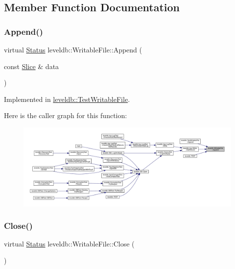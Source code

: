 \subsection{Member Function Documentation}
\mbox{\label{classleveldb_1_1_writable_file_a53b41841d9577d28f65d4d90e1660de8}} 
\subsubsection{\texorpdfstring{Append()}{Append()}}
{\footnotesize\ttfamily virtual \mbox{\hyperlink{classleveldb_1_1_status}{Status}} leveldb\+::\+Writable\+File\+::\+Append (\begin{DoxyParamCaption}\item[{const \mbox{\hyperlink{classleveldb_1_1_slice}{Slice}} \&}]{data }\end{DoxyParamCaption})\hspace{0.3cm}{\ttfamily [pure virtual]}}



Implemented in \mbox{\hyperlink{classleveldb_1_1_test_writable_file_a282d3c3c27ef70c65f467f50abfd93bb}{leveldb\+::\+Test\+Writable\+File}}.

Here is the caller graph for this function\+:
\nopagebreak
\begin{figure}[H]
\begin{center}
\leavevmode
\includegraphics[width=350pt]{classleveldb_1_1_writable_file_a53b41841d9577d28f65d4d90e1660de8_icgraph}
\end{center}
\end{figure}
\mbox{\label{classleveldb_1_1_writable_file_a2efbf9c02a26028b5002df73b4393915}} 
\subsubsection{\texorpdfstring{Close()}{Close()}}
{\footnotesize\ttfamily virtual \mbox{\hyperlink{classleveldb_1_1_status}{Status}} leveldb\+::\+Writable\+File\+::\+Close (\begin{DoxyParamCaption}{ }\end{DoxyParamCaption})\hspace{0.3cm}{\ttfamily [pure virtual]}}



